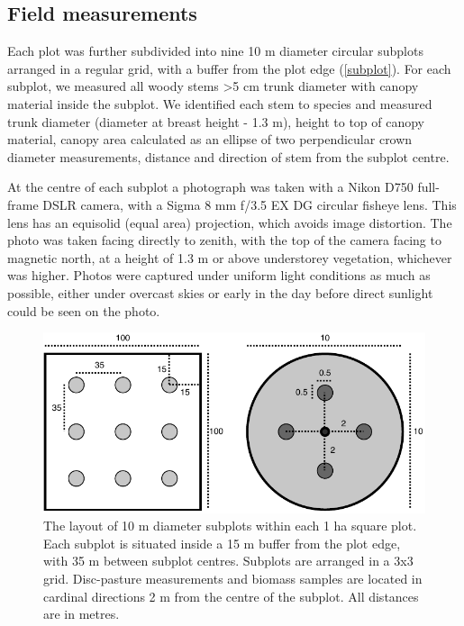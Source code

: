 \documentclass[11pt,a4paper]{article}
\begin{document}
\subsection{Field measurements}

Each plot was further subdivided into nine 10 m diameter circular subplots arranged in a regular grid, with a buffer from the plot edge (\autoref{subplot}). For each subplot, we measured all woody stems >5 cm trunk diameter with canopy material inside the subplot. We identified each stem to species and measured trunk diameter (diameter at breast height - 1.3 m), height to top of canopy material, canopy area calculated as an ellipse of two perpendicular crown diameter measurements, distance and direction of stem from the subplot centre.

At the centre of each subplot a photograph was taken with a Nikon D750 full-frame DSLR camera, with a Sigma 8 mm f/3.5 EX DG circular fisheye lens. This lens has an equisolid (equal area) projection, which avoids image distortion. The photo was taken facing directly to zenith, with the top of the camera facing to magnetic north, at a height of 1.3 m or above understorey vegetation, whichever was higher. Photos were captured under uniform light conditions as much as possible, either under overcast skies or early in the day before direct sunlight could be seen on the photo. 

\begin{figure}[H]
\centering
	\includegraphics[width=\textwidth]{subplot}
	\caption{The layout of 10 m diameter subplots within each 1 ha square plot. Each subplot is situated inside a 15 m buffer from the plot edge, with 35 m between subplot centres. Subplots are arranged in a 3x3 grid. Disc-pasture measurements and biomass samples are located in cardinal directions 2 m from the centre of the subplot. All distances are in metres.}
	\label{subplot}
\end{figure}
\end{document}
